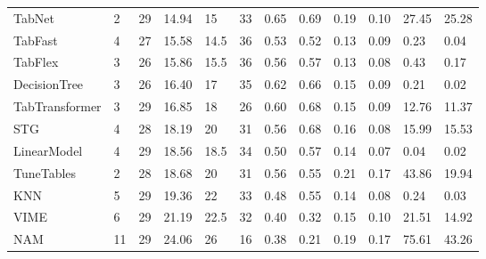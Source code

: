 \begin{tabular}{lllllrllllll}
TabNet & 2 & 29 & 14.94 & 15 & 33 & 0.65 & 0.69 & 0.19 & 0.10 & 27.45 & 25.28 \\
TabFast & 4 & 27 & 15.58 & 14.5 & 36 & 0.53 & 0.52 & 0.13 & 0.09 & 0.23 & 0.04 \\
TabFlex & 3 & 26 & 15.86 & 15.5 & 36 & 0.56 & 0.57 & 0.13 & 0.08 & 0.43 & 0.17 \\
DecisionTree & 3 & 26 & 16.40 & 17 & 35 & 0.62 & 0.66 & 0.15 & 0.09 & 0.21 & 0.02 \\
TabTransformer & 3 & 29 & 16.85 & 18 & 26 & 0.60 & 0.68 & 0.15 & 0.09 & 12.76 & 11.37 \\
STG & 4 & 28 & 18.19 & 20 & 31 & 0.56 & 0.68 & 0.16 & 0.08 & 15.99 & 15.53 \\
LinearModel & 4 & 29 & 18.56 & 18.5 & 34 & 0.50 & 0.57 & 0.14 & 0.07 & 0.04 & 0.02 \\
TuneTables & 2 & 28 & 18.68 & 20 & 31 & 0.56 & 0.55 & 0.21 & 0.17 & 43.86 & 19.94 \\
KNN & 5 & 29 & 19.36 & 22 & 33 & 0.48 & 0.55 & 0.14 & 0.08 & 0.24 & 0.03 \\
VIME & 6 & 29 & 21.19 & 22.5 & 32 & 0.40 & 0.32 & 0.15 & 0.10 & 21.51 & 14.92 \\
NAM & 11 & 29 & 24.06 & 26 & 16 & 0.38 & 0.21 & 0.19 & 0.17 & 75.61 & 43.26 \\
\bottomrule
\end{tabular}
